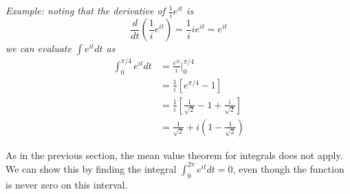 \documentclass{article}
\begin{document}
\textit{Example: noting that the derivative of $\frac{1}{i} e^{it}$ is
\[
	\frac{d}{dt} \left( \frac{1}{i} e^{it} \right)
	= \frac{1}{i} ie^{it}
	= e^{it}
\]
we can evaluate $\int e^{it} dt$ as
\begin{align*}
	\int_0^{\pi/4} e^{it} dt 
	&= \frac{e^{it}}{i} \Big|_0^{\pi/4} \\
	&= \frac{1}{i} \left[ e^{\pi/4} - 1 \right] \\
	&= \frac{1}{i} \left[ \frac{1}{\sqrt{2}} - 1 + \frac{i}{\sqrt{2}} \right] \\
	&= \frac{1}{\sqrt{2}} + i\left( 1 - \frac{1}{\sqrt{2}} \right)
\end{align*}}

As in the previous section, the mean value theorem for integrals does not apply. We can show this by finding the integral $\int_0^{2\pi} e^{it} dt = 0$, even though the function is never zero on this interval.
\end{document}
